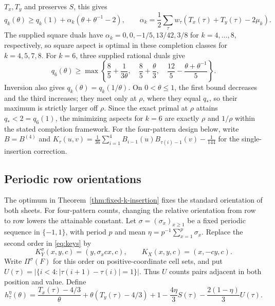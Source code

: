 $T_x,T_y$ and preserves $S$, this gives
\[
 q_k(\theta)\ge q_k(1)+\alpha_k(\theta+\theta^{-1}-2),\qquad
 \alpha_k=\frac12\sum_\tau w_\tau(T_x(\tau)+T_y(\tau)-2\mu_k).
\]
The supplied square duals have $\alpha_k=0,0,-1/5,13/42,3/8$ for
$k=4,\ldots,8$, respectively, so square aspect is optimal in these
completion classes for $k=4,5,7,8$.  For $k=6$, three supplied rational
duals give
\[
 q_6(\theta)\ge\max\left\{\frac85+\frac1{3\theta},\quad
               \frac85+\frac\theta3,\quad
               \frac{12}5-\frac{\theta+\theta^{-1}}5\right\}.
\]
Inversion also gives $q_k(\theta)=q_k(1/\theta)$.  On $0<\theta\le1$,
the first bound decreases and the third increases; they meet only at $\rho$,
where they equal $q_*$, so their maximum is strictly larger off $\rho$.
Since the exact primal at $\rho$ attains $q_*<2=q_6(1)$, the minimizing
aspects for $k=6$ are exactly $\rho$ and $1/\rho$ within the stated
completion framework.
For the four-pattern design below, write $B=B^{(4)}$ and
$K_\tau(u,v)=\frac1{36}\sum_{i=1}^4B_{i-1}(u)B_{\tau(i)-1}(v)-\frac1{144}$
for the single-insertion correction.

\subsection{Periodic row orientations}
\label{sec:oriented-four}
The optimum in Theorem~\ref{thm:fixed-k-insertion} fixes the standard
orientation of both sheets.  For four-pattern counts, changing the relative
orientation from row to row lowers the attainable constant.  Let
$\sigma=(\sigma_x)_{x\ge1}$ be a fixed periodic sequence in $\{-1,1\}$,
with period $p$ and mean $\eta=p^{-1}\sum_{x=1}^p\sigma_x$.  Replace the
second order in \eqref{eq:keys} by
\[
 K_Y^\sigma(x,y,c)=(y,\sigma_xcx,c),
 \qquad K_X(x,y,c)=(x,-cy,c).
\]
Write $\Pi^\sigma(F)$ for this order on positive-coordinate cell sets, and put
$U(\tau)=|\{i<4:|\tau(i+1)-\tau(i)|=1\}|$.  Thus $U$ counts pairs
adjacent in both position and value.  Define
\begin{equation}\label{eq:oriented-h}
 h^\eta_\tau(\theta)=\frac{T_x(\tau)-4/3}{\theta}
 +\theta(T_y(\tau)-4/3)+1-\frac{4\eta}{3}S(\tau)
 -\frac{2(1-\eta)}3U(\tau).
\end{equation}

